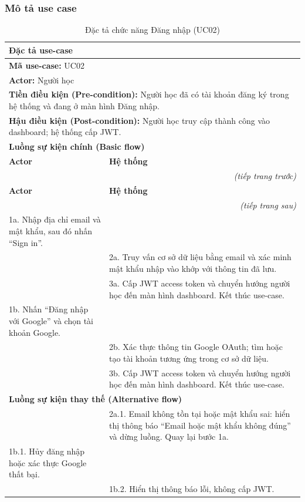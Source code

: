 \subsubsection{Mô tả use case}
\renewcommand{\arraystretch}{1.3}
\setlength{\tbu}{\dimexpr(\linewidth - 4\tabcolsep - 3\arrayrulewidth)/2\relax}
\begin{longtable}{|p{\tbu}|p{\tbu}|}
    \caption{Đặc tả chức năng Đăng nhập (UC02)} \label{tab:uc02_spec} \\
    
    \hline
    \multicolumn{2}{|l|}{\textbf{Đặc tả use-case}} \\ \hline
    \multicolumn{2}{|l|}{\textbf{Mã use-case:} UC02} \\ \hline
    \multicolumn{2}{|l|}{\textbf{Actor:} Người học} \\ \hline
    \multicolumn{2}{|p{\dimexpr\linewidth-2\tabcolsep-2\arrayrulewidth\relax}|}{\textbf{Tiền điều kiện (Pre-condition):} Người học đã có tài khoản đăng ký trong hệ thống và đang ở màn hình Đăng nhập.} \\ \hline
    \multicolumn{2}{|p{\dimexpr\linewidth-2\tabcolsep-2\arrayrulewidth\relax}|}{\textbf{Hậu điều kiện (Post-condition):} Người học truy cập thành công vào dashboard; hệ thống cấp JWT.} \\ \hline
    \multicolumn{2}{|l|}{\textbf{Luồng sự kiện chính (Basic flow)}} \\ \hline
    \textbf{Actor} & \textbf{Hệ thống} \\ \hline
    \endfirsthead
    \multicolumn{2}{r}{\textit{(tiếp trang trước)}} \\
    \hline
    \textbf{Actor} & \textbf{Hệ thống} \\ \hline
    \endhead
    \hline
    \multicolumn{2}{r}{\textit{(tiếp trang sau)}} \\
    \endfoot
    \endlastfoot
    1a. Nhập địa chỉ email và mật khẩu, sau đó nhấn ``Sign in''. & \\ \hline
    & 2a. Truy vấn cơ sở dữ liệu bằng email và xác minh mật khẩu nhập vào khớp với thông tin đã lưu. \\ \hline
    & 3a. Cấp JWT access token và chuyển hướng người học đến màn hình dashboard. Kết thúc use-case. \\ \hline
    1b. Nhấn ``Đăng nhập với Google'' và chọn tài khoản Google. & \\ \hline
    & 2b. Xác thực thông tin Google OAuth; tìm hoặc tạo tài khoản tương ứng trong cơ sở dữ liệu. \\ \hline
    & 3b. Cấp JWT access token và chuyển hướng người học đến màn hình dashboard. Kết thúc use-case. \\ \hline
    \multicolumn{2}{|l|}{\textbf{Luồng sự kiện thay thế (Alternative flow)}} \\ \hline
    & 2a.1. Email không tồn tại hoặc mật khẩu sai: hiển thị thông báo ``Email hoặc mật khẩu không đúng'' và dừng luồng. Quay lại bước 1a. \\ \hline
    1b.1. Hủy đăng nhập hoặc xác thực Google thất bại. & \\ \hline
    & 1b.2. Hiển thị thông báo lỗi, không cấp JWT. \\ \hline
\end{longtable}

